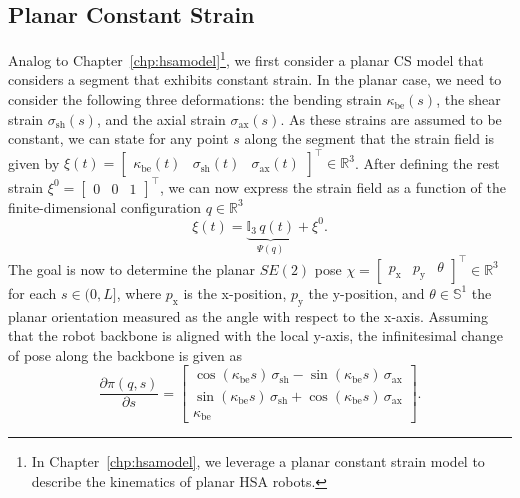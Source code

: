 \subsection{Planar Constant Strain}
Analog to Chapter~\ref{chp:hsamodel}\footnote{In Chapter~\ref{chp:hsamodel}, we leverage a planar constant strain model to describe the kinematics of planar \gls{HSA} robots.}, we first consider a planar \gls{CS} model that considers a segment that exhibits constant strain.
In the planar case, we need to consider the following three deformations: the bending strain $\kappa_\mathrm{be}(s)$, the shear strain $\sigma_\mathrm{sh}(s)$, and the axial strain $\sigma_\mathrm{ax}(s)$. As these strains are assumed to be constant, we can state for any point $s$ along the segment that the strain field is given by $\xi(t) = \begin{bmatrix}
    \kappa_\mathrm{be}(t) & \sigma_\mathrm{sh}(t) & \sigma_\mathrm{ax}(t)
\end{bmatrix}^\top \in \mathbb{R}^3$.
After defining the rest strain $\xi^0 = \begin{bmatrix}
    0 & 0 & 1
\end{bmatrix}^\top$, we can now express the strain field as a function of the finite-dimensional configuration $q \in \mathbb{R}^3$
\begin{equation}
    \xi(t) = \underbrace{\mathbb{I}_3 \, q(t)}_{\Psi(q)} + \xi^0.
\end{equation}
The goal is now to determine the planar $SE(2)$ pose $\chi = \begin{bmatrix}
    p_\mathrm{x} & p_\mathrm{y} & \theta
\end{bmatrix}^\top \in \mathbb{R}^3$ for each $s \in (0,L]$, where $p_\mathrm{x}$ is the x-position, $p_\mathrm{y}$ the y-position, and $\theta \in \mathbb{S}^1$ the planar orientation measured as the angle with respect to the x-axis.
Assuming that the robot backbone is aligned with the local y-axis, the infinitesimal change of pose along the backbone is given as
\begin{equation}
    \frac{\partial \pi(q,s)}{\partial s} = \begin{bmatrix}
        \cos(\kappa_\mathrm{be} s) \, \sigma_\mathrm{sh} - \sin(\kappa_\mathrm{be} s) \, \sigma_\mathrm{ax}\\
        \sin(\kappa_\mathrm{be} s) \, \sigma_\mathrm{sh} + \cos(\kappa_\mathrm{be} s) \, \sigma_\mathrm{ax}\\
        \kappa_\mathrm{be}
    \end{bmatrix}.
\end{equation}
